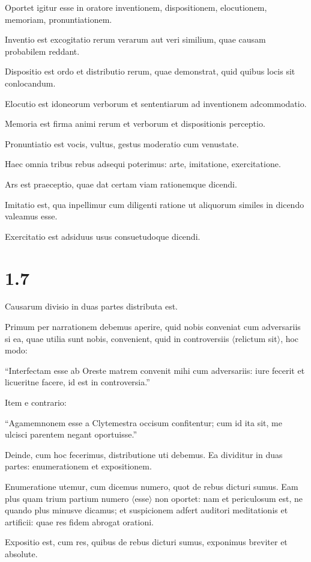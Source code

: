 Oportet igitur esse in oratore inventionem, dispositionem, elocutionem, memoriam, pronuntiationem.

Inventio est excogitatio rerum verarum aut veri similium, quae causam probabilem reddant.

Dispositio est ordo et distributio rerum, quae demonstrat, quid quibus locis sit conlocandum.

Elocutio est idoneorum verborum et sententiarum ad inventionem adcommodatio.

Memoria est firma animi rerum et verborum et dispositionis perceptio.

Pronuntiatio est vocis, vultus, gestus moderatio cum venustate.

Haec omnia tribus rebus adsequi poterimus: arte, imitatione, exercitatione.

Ars est praeceptio, quae dat certam viam rationemque dicendi.

Imitatio est, qua inpellimur cum diligenti ratione ut aliquorum similes in dicendo valeamus esse.

Exercitatio est adsiduus usus consuetudoque dicendi.

\section*{1.7}

Causarum divisio in duas partes distributa est.

Primum per narrationem debemus aperire, quid nobis conveniat cum adversariis si ea, quae utilia sunt nobis, convenient, quid in controversiis $\langle$relictum sit$\rangle$, hoc modo:

``Interfectam esse ab Oreste matrem convenit mihi cum adversariis: iure fecerit et licueritne facere, id est in controversia.''

Item e contrario:

``Agamemnonem esse a Clytemestra occisum confitentur; cum id ita sit, me ulcisci parentem negant oportuisse.''

Deinde, cum hoc fecerimus, distributione uti debemus. Ea dividitur in duas partes: enumerationem et expositionem.

Enumeratione utemur, cum dicemus numero, quot de rebus dicturi sumus. Eam plus quam trium partium numero $\langle$esse$\rangle$ non oportet: nam et periculosum est, ne quando plus minusve dicamus; et suspicionem adfert auditori meditationis et artificii: quae res fidem abrogat orationi.

Expositio est, cum res, quibus de rebus dicturi sumus, exponimus breviter et absolute.

